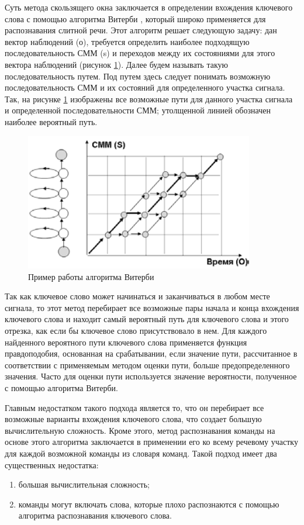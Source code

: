 \documentclass[a4paper,14pt,russian,utf8,nocolumnsxix,nocolumnxxxi,nocolumnxxxii]{eskdtext}
\begin{document}
Суть метода скользящего окна заключается в определении вхождения ключевого слова с помощью алгоритма Витерби \cite{couvreur}, который широко применяется для распознавания слитной речи. Этот алгоритм решает следующую задачу: дан вектор наблюдений (о), требуется определить наиболее подходящую последовательность СММ (s) и переходов между их состояниями для этого вектора наблюдений (рисунок \ref{viterbi}). Далее будем называть такую последовательность путем. Под путем здесь следует понимать возможную последовательность СММ и их состояний для определенного участка сигнала. Так, на рисунке \ref{viterbi} изображены все возможные пути для данного участка сигнала и определенной последовательности СММ; утолщенной линией обозначен наиболее вероятный путь. 
\begin{figure}[h]	
	\centering
	\includegraphics[width=100mm]{viterbi.png}			
	\caption{Пример работы алгоритма Витерби}
	\label{viterbi}
\end{figure}
Так как ключевое слово может начинаться и заканчиваться в любом месте сигнала, то этот метод перебирает все возможные пары начала и конца
вхождения ключевого слова и находит самый вероятный путь для ключевого слова и этого отрезка, как если бы ключевое слово присутствовало в нем. Для каждого найденного вероятного пути ключевого слова применяется функция правдоподобия, основанная на срабатывании, если значение пути, рассчитанное в соответствии с применяемым методом оценки пути, больше предопределенного значения. Часто для оценки пути используется значение вероятности, полученное с помощью алгоритма Витерби.

Главным недостатком такого подхода является то, что он перебирает все возможные варианты вхождения ключевого слова, что создает большую вычислительную сложность. Кроме этого, метод распознавания команды на основе этого алгоритма заключается в применении
его ко всему речевому участку для каждой возможной команды из словаря команд. Такой подход имеет два существенных недостатка:
\begin{enumerate}[1)]
	\item большая вычислительная сложность;
	\item команды могут включать слова, которые плохо распознаются с помощью алгоритма распознавания ключевого слова.
\end{enumerate}
 
\end{document}
